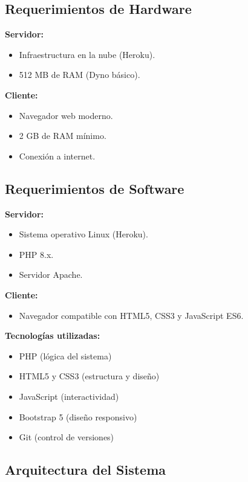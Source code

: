 \documentclass[12pt,a4paper]{article}
\begin{document}
\subsection{Requerimientos de Hardware}

\textbf{Servidor:}
\begin{itemize}
    \item Infraestructura en la nube (Heroku).
    \item 512 MB de RAM (Dyno básico).
\end{itemize}

\textbf{Cliente:}
\begin{itemize}
    \item Navegador web moderno.
    \item 2 GB de RAM mínimo.
    \item Conexión a internet.
\end{itemize}

\subsection{Requerimientos de Software}

\textbf{Servidor:}
\begin{itemize}
    \item Sistema operativo Linux (Heroku).
    \item PHP 8.x.
    \item Servidor Apache.
\end{itemize}

\textbf{Cliente:}
\begin{itemize}
    \item Navegador compatible con HTML5, CSS3 y JavaScript ES6.
\end{itemize}

\textbf{Tecnologías utilizadas:}
\begin{itemize}
    \item PHP (lógica del sistema)
    \item HTML5 y CSS3 (estructura y diseño)
    \item JavaScript (interactividad)
    \item Bootstrap 5 (diseño responsivo)
    \item Git (control de versiones)
\end{itemize}

\subsection{Arquitectura del Sistema}
\end{document}
